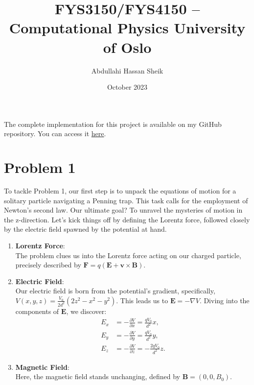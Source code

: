 \documentclass{article}
\title{FYS3150/FYS4150 – Computational Physics University of Oslo}
\author{Abdullahi Hassan Sheik}
\date{October 2023}
\begin{document}
\maketitle

\paragraph{}
The complete implementation for this project is available on my GitHub repository. You can access it \href{https://github.com/SheikAbdullahi/FYS4150Computational-Physics/tree/main/Project3}{here}.

\section{Problem 1}


To tackle Problem 1, our first step is to unpack the equations of motion for a solitary particle navigating a Penning trap. This task calls for the employment of Newton's second law. Our ultimate goal? To unravel the mysteries of motion in the z-direction. Let's kick things off by defining the Lorentz force, followed closely by the electric field spawned by the potential at hand.

\begin{enumerate}
    \item \textbf{Lorentz Force}:\\
    The problem clues us into the Lorentz force acting on our charged particle, precisely described by \(\mathbf{F} = q(\mathbf{E} + \mathbf{v} \times \mathbf{B})\).
    
    \item \textbf{Electric Field}:\\
    Our electric field is born from the potential's gradient, specifically, \(V(x, y, z) = \frac{V_0}{2d^2}(2z^2 - x^2 - y^2)\). This leads us to \(\mathbf{E} = -\nabla V\). Diving into the components of \(\mathbf{E}\), we discover:
    \begin{align*}
    E_x &= -\frac{\partial V}{\partial x} = \frac{qV_0}{d^2}x,\\
    E_y &= -\frac{\partial V}{\partial y} = \frac{qV_0}{d^2}y,\\
    E_z &= -\frac{\partial V}{\partial z} = -\frac{2qV_0}{d^2}z.
    \end{align*}
    
    \item \textbf{Magnetic Field}:\\
    Here, the magnetic field stands unchanging, defined by \(\mathbf{B} = (0, 0, B_0)\).
\end{enumerate}
\end{document}
